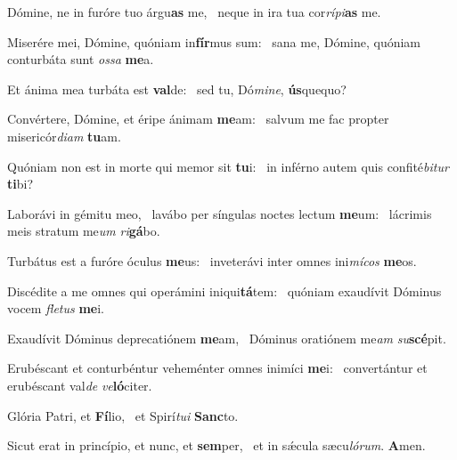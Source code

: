 \item Dómine, ne in furóre tuo árgu\textbf{as} me,~\psstar{} neque in ira tua cor\textit{rípi}\textbf{as} me.
\item Miserére mei, Dómine, quóniam in\textbf{fír}mus sum:~\psstar{} sana me, Dómine, quóniam conturbáta sunt \textit{ossa} \textbf{me}a.
\item Et ánima mea turbáta est \textbf{val}de:~\psstar{} sed tu, Dó\textit{mine}, \textbf{ús}quequo?
\item Convértere, Dómine, et éripe ánimam \textbf{me}am:~\psstar{} salvum me fac propter misericór\textit{diam} \textbf{tu}am.
\item Quóniam non est in morte qui memor sit \textbf{tu}i:~\psstar{} in inférno autem quis confité\textit{bitur} \textbf{ti}bi?
\item Laborávi in gémitu meo,~\pscross{} lavábo per síngulas noctes lectum \textbf{me}um:~\psstar{} lácrimis meis stratum me\textit{um} \textit{ri}\textbf{gá}bo.
\item Turbátus est a furóre óculus \textbf{me}us:~\psstar{} inveterávi inter omnes ini\textit{mícos} \textbf{me}os.
\item Discédite a me omnes qui operámini iniqui\textbf{tá}tem:~\psstar{} quóniam exaudívit Dóminus vocem \textit{fletus} \textbf{me}i.
\item Exaudívit Dóminus deprecatiónem \textbf{me}am,~\psstar{} Dóminus oratiónem me\textit{am} \textit{su}\textbf{scé}pit.
\item Erubéscant et conturbéntur veheménter omnes inimíci \textbf{me}i:~\psstar{} convertántur et erubéscant val\textit{de} \textit{ve}\textbf{ló}citer.
\item Glória Patri, et \textbf{Fí}lio,~\psstar{} et Spirí\textit{tui} \textbf{Sanc}to.
\item Sicut erat in princípio, et nunc, et \textbf{sem}per,~\psstar{} et in sǽcula sæcu\textit{lórum}. \textbf{A}men.
